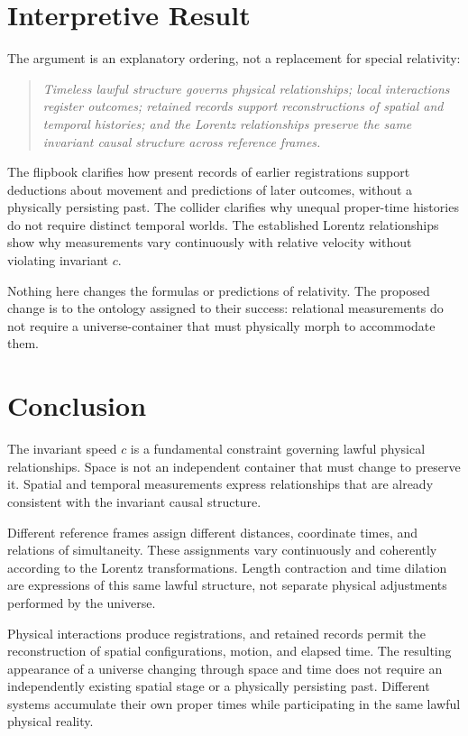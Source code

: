 \documentclass[11pt]{article}
\begin{document}
\section{Interpretive Result}

The argument is an explanatory ordering, not a replacement for special relativity:
\begin{quote}
\emph{Timeless lawful structure governs physical relationships; local interactions register outcomes; retained records support reconstructions of spatial and temporal histories; and the Lorentz relationships preserve the same invariant causal structure across reference frames.}
\end{quote}

The flipbook clarifies how present records of earlier registrations support deductions about movement and predictions of later outcomes, without a physically persisting past. The collider clarifies why unequal proper-time histories do not require distinct temporal worlds. The established Lorentz relationships show why measurements vary continuously with relative velocity without violating invariant $c$.

Nothing here changes the formulas or predictions of relativity. The proposed change is to the ontology assigned to their success: relational measurements do not require a universe-container that must physically morph to accommodate them.

\section{Conclusion}

The invariant speed $c$ is a fundamental constraint governing lawful physical relationships. Space is not an independent container that must change to preserve it. Spatial and temporal measurements express relationships that are already consistent with the invariant causal structure.

Different reference frames assign different distances, coordinate times, and relations of simultaneity. These assignments vary continuously and coherently according to the Lorentz transformations. Length contraction and time dilation are expressions of this same lawful structure, not separate physical adjustments performed by the universe.

Physical interactions produce registrations, and retained records permit the reconstruction of spatial configurations, motion, and elapsed time. The resulting appearance of a universe changing through space and time does not require an independently existing spatial stage or a physically persisting past. Different systems accumulate their own proper times while participating in the same lawful physical reality.
\end{document}
